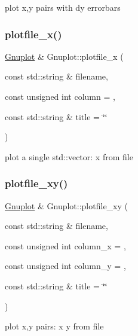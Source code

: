 plot x,y pairs with dy errorbars \mbox{\label{class_gnuplot_a4fc34218cdfdd27a65b92eea1f1f9e84}} 
\subsubsection{\texorpdfstring{plotfile\+\_\+x()}{plotfile\_x()}}
{\footnotesize\ttfamily \mbox{\hyperlink{class_gnuplot}{Gnuplot}} \& Gnuplot\+::plotfile\+\_\+x (\begin{DoxyParamCaption}\item[{const std\+::string \&}]{filename,  }\item[{const unsigned int}]{column = {},  }\item[{const std\+::string \&}]{title = {\ttfamily \char`\"{}\char`\"{}} }\end{DoxyParamCaption})}

plot a single std\+::vector\+: x from file \mbox{\label{class_gnuplot_a10e1fc7344bd726faa2d70cd5ced5e5e}} 
\subsubsection{\texorpdfstring{plotfile\+\_\+xy()}{plotfile\_xy()}}
{\footnotesize\ttfamily \mbox{\hyperlink{class_gnuplot}{Gnuplot}} \& Gnuplot\+::plotfile\+\_\+xy (\begin{DoxyParamCaption}\item[{const std\+::string \&}]{filename,  }\item[{const unsigned int}]{column\+\_\+x = {},  }\item[{const unsigned int}]{column\+\_\+y = {},  }\item[{const std\+::string \&}]{title = {\ttfamily \char`\"{}\char`\"{}} }\end{DoxyParamCaption})}

plot x,y pairs\+: x y from file \mbox{\label{class_gnuplot_afe9d44ba12f617188111ab915010f3ab}} 
